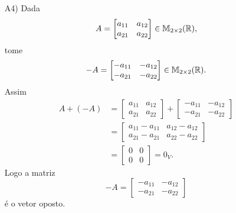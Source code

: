 \documentclass[12pt]{exam}
\begin{document}
\begin{itemize}
        \item[A4)] Dada
        \[
        A = \begin{bmatrix} a_{11} & a_{12}\\a_{21} & a_{22}\end{bmatrix} \in \mathbb{M}_{2 \times 2}(\mathbb{R}),
        \]
        tome
        \[
        -A = \begin{bmatrix} -a_{11} & -a_{12}\\-a_{21} & -a_{22}\end{bmatrix} \in \mathbb{M}_{2 \times 2}(\mathbb{R}).
        \]
        Assim
        \begin{align*}
            A + (-A) & = \begin{bmatrix} a_{11} & a_{12}\\a_{21} & a_{22}\end{bmatrix} +
            \begin{bmatrix} -a_{11} & -a_{12}\\-a_{21} & -a_{22}\end{bmatrix}
            \\ &= \begin{bmatrix} a_{11} - a_{11} & a_{12} - a_{12}\\a_{21} - a_{21} & a_{22} - a_{22}\end{bmatrix}
            \\ &= \begin{bmatrix}0 & 0\\0 & 0\end{bmatrix} = 0_V.
        \end{align*}
        Logo a matriz
        \[
        -A = \begin{bmatrix} -a_{11} & -a_{12}\\-a_{21} & -a_{22}\end{bmatrix}
        \]
        é o vetor oposto.


\end{itemize}
\end{document}
